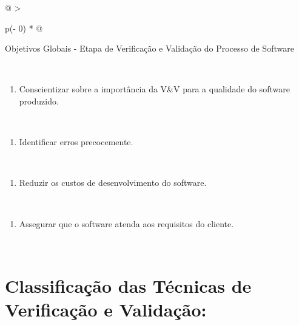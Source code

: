 \documentclass[
]{book}
\providecommand{\tightlist}{%
  \setlength{\itemsep}{0pt}\setlength{\parskip}{0pt}}
\begin{document}
\begin{longtable}[]{@{}
  >{\raggedright\arraybackslash}p{(\columnwidth - 0\tabcolsep) * }@{}}
\toprule\noalign{}
\begin{minipage}[b]{\linewidth}\raggedright
Objetivos Globais - Etapa de Verificação e Validação do Processo de Software
\end{minipage} \\
\midrule\noalign{}
\endhead
\bottomrule\noalign{}
\endlastfoot
\begin{minipage}[t]{\linewidth}\raggedright
\begin{enumerate}
\def\labelenumi{\arabic{enumi})}
\tightlist
\item
  Conscientizar sobre a importância da V\&V para a qualidade do software produzido.
\end{enumerate}
\end{minipage} \\
\begin{minipage}[t]{\linewidth}\raggedright
\begin{enumerate}
\def\labelenumi{\arabic{enumi})}
\setcounter{enumi}{1}
\tightlist
\item
  Identificar erros precocemente.
\end{enumerate}
\end{minipage} \\
\begin{minipage}[t]{\linewidth}\raggedright
\begin{enumerate}
\def\labelenumi{\arabic{enumi})}
\setcounter{enumi}{2}
\tightlist
\item
  Reduzir os custos de desenvolvimento do software.
\end{enumerate}
\end{minipage} \\
\begin{minipage}[t]{\linewidth}\raggedright
\begin{enumerate}
\def\labelenumi{\arabic{enumi})}
\setcounter{enumi}{3}
\tightlist
\item
  Assegurar que o software atenda aos requisitos do cliente.
\end{enumerate}
\end{minipage} \\
\end{longtable}

\section{Classificação das Técnicas de Verificação e Validação:}\label{classificauxe7uxe3o-das-tuxe9cnicas-de-verificauxe7uxe3o-e-validauxe7uxe3o}
\end{document}
